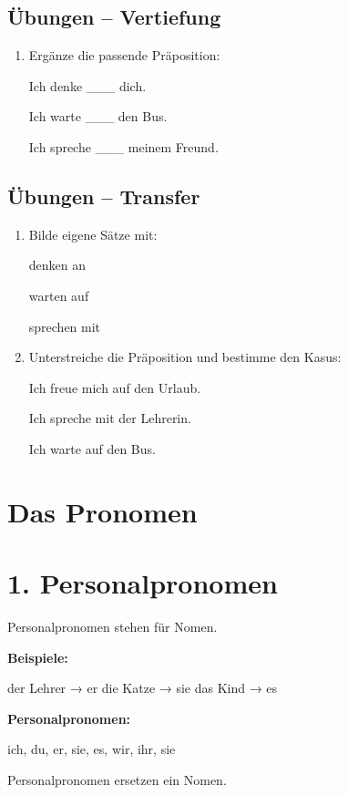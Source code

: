 \documentclass[a4paper,12pt]{article}
\begin{document}
\subsection*{Übungen – Vertiefung}

\begin{enumerate}
\item Ergänze die passende Präposition:

Ich denke \_\_\_ dich.

Ich warte \_\_\_ den Bus.

Ich spreche \_\_\_ meinem Freund.
\end{enumerate}

\subsection*{Übungen – Transfer}

\begin{enumerate}
\item Bilde eigene Sätze mit:

denken an  

warten auf  

sprechen mit  

\item Unterstreiche die Präposition und bestimme den Kasus:

Ich freue mich auf den Urlaub.

Ich spreche mit der Lehrerin.

Ich warte auf den Bus.
\end{enumerate}

\newpage

\section*{Das Pronomen}

\section*{1. Personalpronomen}

Personalpronomen stehen für Nomen.

\textbf{Beispiele:}

der Lehrer → er  
die Katze → sie  
das Kind → es  

\textbf{Personalpronomen:}

ich, du, er, sie, es, wir, ihr, sie  

\begin{merksatz}
Personalpronomen ersetzen ein Nomen.
\end{merksatz}
\end{document}
